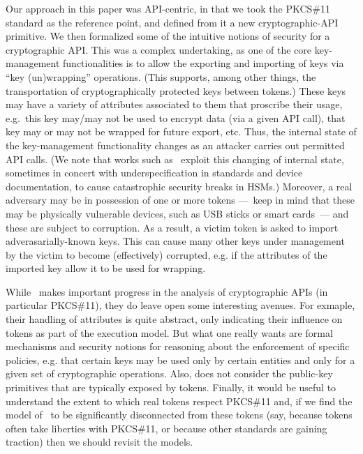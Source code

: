 Our approach in this paper was API-centric, in that we took the PKCS\#11
standard as the reference point, and defined from it a new cryptographic-API
primitive.
%
%
We then formalized some of the intuitive notions of security for a
cryptographic API.  This was a complex undertaking, as one of the core
key-management functionalities is to allow the exporting and importing of keys
via ``key (un)wrapping'' operations.  (This supports, among other things, the
transportation of cryptographically protected keys between tokens.)  These keys
may have a variety of attributes associated to them that proscribe their usage,
e.g.\ this key may/may not be used to encrypt data (via a given API call), that
key may or may not be wrapped for future export, etc.  Thus, the internal state of
the key-management functionality changes as an attacker carries out permitted
API calls. (We note that works such as~\cite{KS13} exploit this changing of
internal state, sometimes in concert with underspecification in standards and
device documentation, to cause catastrophic security breaks in HSMs.) Moreover,
a real adversary may be in possession of one or more tokens ---~keep in mind
that these may be physically vulnerable devices, such as USB sticks or smart
cards~--- and these are subject to corruption.  As a result, a victim token is
asked to import adverasarially-known keys.  This can cause many other keys under
management by the victim to become (effectively) corrupted, e.g. if the
attributes of the imported key allow it to be used for wrapping.
%

While~\cite{SSW} makes important progress in the analysis of
cryptographic APIs (in particular PKCS\#11), they do leave open some
interesting avenues.  For exmaple, their handling of attributes is
quite abstract, only indicating their influence on tokens as part of
the execution model.  But what one really wants are formal mechanisms and
security notions for reasoning about the enforcement of specific
policies, e.g. that certain keys may be used only by certain entities
and only for a given set of cryptographic operations.  Also,
\cite{SSW} does not consider the public-key primitives that are
typically exposed by tokens.  Finally, it would be useful to
understand the extent to which real tokens respect PKCS\#11 and, if we
find the model of~\cite{SSW} to be significantly disconnected from
these tokens (say, because tokens often take liberties with PKCS\#11,
or because other standards are gaining traction) then we should
revisit the models.

